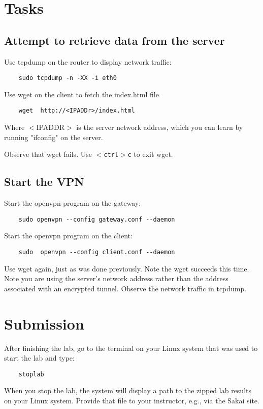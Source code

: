 \section{Tasks}
\subsection{Attempt to retrieve data from the server}
Use tcpdump on the router to display network traffic:
\begin{verbatim}
    sudo tcpdump -n -XX -i eth0
\end{verbatim}

Use wget on the client to fetch the index.html file
\begin{verbatim}
    wget  http://<IPADDr>/index.html
\end{verbatim}
Where $<$IPADDR$>$ is the server network address, which you
can learn by running "ifconfig" on the server.

Observe that wget fails.  Use {\tt $<$ctrl$>$c} to exit wget.

\subsection{Start the VPN}
Start the openvpn program on the gateway:
\begin{verbatim}
    sudo openvpn --config gateway.conf --daemon
\end{verbatim}

Start the openvpn program on the client:
\begin{verbatim}
    sudo  openvpn --config client.conf --daemon
\end{verbatim}

Use wget again, just as was done previously.
Note the wget succeeds this time.
Note you are using the server's network address
rather than the address associated with an encrypted tunnel.
Observe the network traffic in tcpdump.

\section{Submission}
After finishing the lab, go to the terminal on your Linux system that was used to start the lab and type:
\begin{verbatim}
    stoplab 
\end{verbatim}
When you stop the lab, the system will display a path to the zipped lab results on your Linux system.  Provide that file to 
your instructor, e.g., via the Sakai site.

\copyrightnotice


